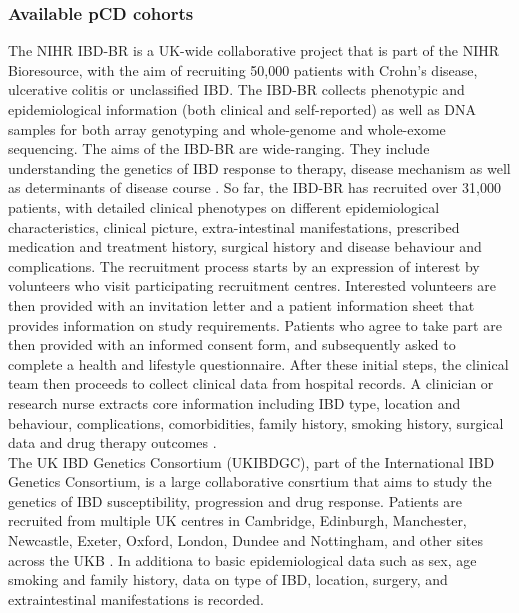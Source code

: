 \subsubsection{Available pCD cohorts}
The NIHR IBD-BR is a UK-wide collaborative project that is part of the NIHR Bioresource, with the aim of recruiting 50,000 patients with Crohn's disease, ulcerative colitis or unclassified IBD. The IBD-BR collects phenotypic and epidemiological information (both clinical and self-reported) as well as DNA samples for both array genotyping and whole-genome and whole-exome sequencing. The aims of the IBD-BR are wide-ranging. They include understanding the genetics of IBD response to therapy, disease mechanism as well as determinants of disease course \cite{ibdbr-protocol-v8,ibdbr-questionnaire-v7,ibdbr-further-info}. So far, the IBD-BR has recruited over 31,000 patients, with detailed clinical phenotypes on different epidemiological characteristics, clinical picture, extra-intestinal manifestations, prescribed medication and treatment history, surgical history and disease behaviour and complications. The recruitment process starts by an expression of interest by volunteers who visit participating recruitment centres. Interested volunteers are then provided with an invitation letter and a patient information sheet that provides information on study requirements. Patients who agree to take part are then provided with an informed consent form, and subsequently asked to complete a health and lifestyle questionnaire. After these initial steps, the clinical team then proceeds to collect clinical data from hospital records. A clinician or research nurse extracts core information including IBD type, location and behaviour, complications, comorbidities, family history, smoking history, surgical data and
drug therapy outcomes \cite{ibdbr-protocol-v8}. \\

The UK IBD Genetics Consortium (UKIBDGC), part of the International IBD Genetics Consortium, is a large collaborative consrtium that aims to study the genetics of IBD susceptibility, progression and drug response. Patients are recruited from multiple UK centres in Cambridge, Edinburgh, Manchester, Newcastle, Exeter, Oxford, London, Dundee and Nottingham, and other sites across the UKB \cite{ukibdgc-info}. In additiona to basic epidemiological data such as sex, age smoking and family history, data on type of IBD, location, surgery, and extraintestinal manifestations is recorded. \\

